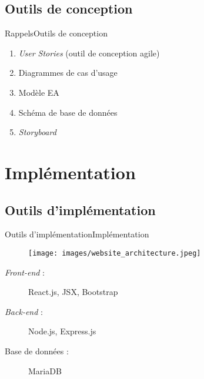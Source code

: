 \documentclass[usenames,dvipsnames]{beamer}
\begin{document}
\subsection{Outils de conception}
\begin{frame}{Rappels}{Outils de conception}
  \begin{enumerate}
    \item \textit{User Stories} (outil de conception agile)
    \item Diagrammes de cas d'usage
    \item Modèle EA
    \item Schéma de base de données
    \item \textit{Storyboard}
  \end{enumerate}
\end{frame}
\section{Implémentation}
\subsection{Outils d'implémentation}
\begin{frame}{Outils d'implémentation}{Implémentation}
  \begin{figure}[!ht]
    \centering
    \texttt{[image: images/website\_architecture.jpeg]}
  \end{figure}

  \begin{description}
    \item [\textit{Front-end} :] React.js, JSX, Bootstrap
    \item [\textit{Back-end} :] Node.js, Express.js
    \item [Base de données :] MariaDB
  \end{description}
\end{frame}
\end{document}
